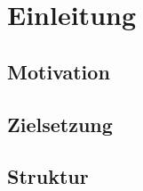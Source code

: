 \chapter{Einleitung}
\label{einleitung}


\section{Motivation}
\label{motivation}


\section{Zielsetzung}
\label{zielsetzung}


\section{Struktur}
\label{struktur}

